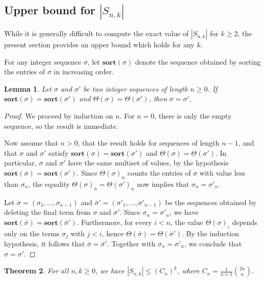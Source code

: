 \documentclass[11pt]{article}
\newtheorem{thm}{Theorem}[section]
\newtheorem{lem}[thm]{Lemma}
\theoremstyle{remark}
\theoremstyle{definition}
\newcommand{\sort}{\mathbf{sort}}
\begin{document}
\subsection{Upper bound for \texorpdfstring{$|S_{n,k}|$}{|Snk|}}
While it is generally difficult to compute the exact value of $|S_{n,k}|$ for $k \geq 2$, the present section provides an upper bound which holds for any $k$.

For any integer sequence $\sigma$, let $\sort(\sigma)$ denote the sequence obtained by sorting the entries of $\sigma$ in increasing order.

\begin{lem} \label{lem_injectivity}
    Let $\sigma$ and $\sigma'$ be two integer sequences of length $n \geq 0$. If $\sort(\sigma) = \sort(\sigma')$ and $\Theta(\sigma) = \Theta(\sigma')$, then $\sigma = \sigma'$.
\end{lem}

\begin{proof}
We proceed by induction on $n$. For $n=0$, there is only the empty sequence, so the result is immediate.

Now assume that $n>0$, that the result holds for sequences of length $n-1$, and that $\sigma$ and $\sigma'$ satisfy $\sort(\sigma) = \sort(\sigma')$ and $\Theta(\sigma) = \Theta(\sigma')$. In particular, $\sigma$ and $\sigma'$ have the same multiset of values, by the hypothesis $\sort(\sigma) = \sort(\sigma')$. Since $\Theta(\sigma)_n$ counts the entries of $\sigma$ with value less than $\sigma_n$, the equality $\Theta(\sigma)_n = \Theta(\sigma')_n$ now implies that $\sigma_n = \sigma'_n$.

Let $\bar{\sigma}=(\sigma_1,\ldots,\sigma_{n-1})$ and $\bar{\sigma}'=(\sigma'_1,\ldots,\sigma'_{n-1})$ be the sequences obtained by deleting the final term from $\sigma$ and $\sigma'$. Since $\sigma_n=\sigma'_n$, we have $\sort(\bar{\sigma})=\sort(\bar{\sigma}')$.
Furthermore, for every $i<n$, the value $\Theta(\sigma)_i$ depends only on the terms $\sigma_j$ with $j<i$, hence $\Theta(\bar{\sigma})=\Theta(\bar{\sigma}')$.
By the induction hypothesis, it follows that $\bar{\sigma}=\bar{\sigma}'$. Together with $\sigma_n=\sigma'_n$, we conclude that $\sigma=\sigma'$.
\end{proof}

\begin{thm}\label{thm:Catalan_bound}
For all $n,k\geq0$, we have $|S_{n,k}|\leq (C_n)^k$, where $C_n=\frac{1}{n+1}\binom{2n}{n}$.
\end{thm}
\end{document}
